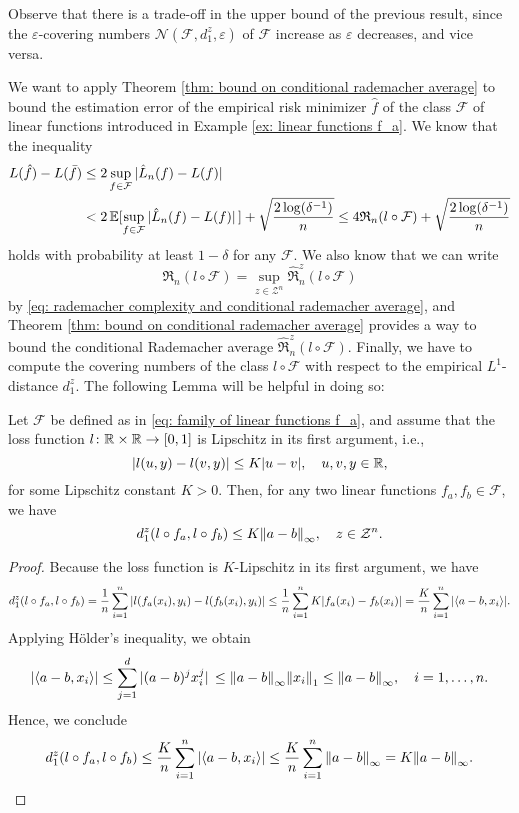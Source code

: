Observe that there is a trade-off in the upper bound of the previous result, since the $\varepsilon$-covering numbers $\mathcal{N}(\mathcal{F}, d_1^z, \varepsilon)$ of $\mathcal{F}$ increase as $\varepsilon$ decreases, and vice versa. 

We want to apply Theorem \ref{thm: bound on conditional rademacher average} to bound the estimation error of the empirical risk minimizer $\hat{f}$ of the class $\mathcal{F}$ of linear functions introduced in Example \ref{ex: linear functions f_a}. We know that the inequality
\begin{align*}
    L(\hat{f}) - L(\bar{f}) &\leq 2 \sup_{f \in \mathcal{F}} \abs*{\hat{L}_n(f) - L(f)} \\
    &< 2 \operatorname{\mathbb{E}}[\sup_{f \in \mathcal{F}} \abs*{\hat L_n(f) - L(f)}] + \sqrt{\frac{2 \log(\delta^{-1})}{n}} \leq 4 \mathfrak{R}_n(l \circ \mathcal{F}) + \sqrt{\frac{2 \log(\delta^{-1})}{n}}
\end{align*}
holds with probability at least $1 - \delta$ for any $\mathcal{F}$. We also know that we can write
\[
    \mathfrak{R}_n(l \circ \mathcal{F}) = \sup_{z \in \mathcal{Z}^n} \hat{\mathfrak{R}}_n^z(l \circ \mathcal{F})
\]
by \eqref{eq: rademacher complexity and conditional rademacher average}, and Theorem \ref{thm: bound on conditional rademacher average} provides a way to bound the conditional Rademacher average $\hat{\mathfrak{R}}_n^z(l \circ \mathcal{F})$. Finally, we have to compute the covering numbers of the class $l \circ \mathcal{F}$ with respect to the empirical $L^1$-distance $d_1^z$. The following Lemma will be helpful in doing so:

\begin{lemma}
\label{lem: distance between linear functions f_a}
Let $\mathcal{F}$ be defined as in \eqref{eq: family of linear functions f_a}, and assume that the loss function $l \colon \mathbb{R} \times \mathbb{R} \to [0, 1]$ is Lipschitz in its first argument, i.e.,
\[
    \abs{l(u, y) - l(v, y)} \leq K \abs{u - v}, \quad u, v, y \in \mathbb{R},
\]
for some Lipschitz constant $K > 0$. Then, for any two linear functions $f_a, f_b \in \mathcal{F}$, we have
\[
    d_1^z(l \circ f_a, l \circ f_b) \leq K \norm{a - b}_{\infty}, \quad z \in \mathcal{Z}^n.
\]
\end{lemma}

\begin{proof}
Because the loss function is $K$-Lipschitz in its first argument, we have
\[
    d_1^z(l \circ f_a, l \circ f_b) = \frac{1}{n} \sum_{i=1}^n \abs{l(f_a(x_i), y_i) - l(f_b(x_i), y_i)} \leq \frac{1}{n} \sum_{i=1}^n K \abs{f_a(x_i) - f_b(x_i)} = \frac{K}{n} \sum_{i=1}^n \abs{\langle a - b, x_i \rangle}.
\]
Applying H{\"o}lder's inequality, we obtain
\[
    \abs{\langle a - b, x_i \rangle} \leq \sum_{j=1}^d \abs*{(a - b)^j x_i^j} \leq \norm{a - b}_{\infty} \norm{x_i}_1 \leq \norm{a - b}_{\infty}, \quad i = 1, \dots, n.
\]
Hence, we conclude
\[
    d_1^z(l \circ f_a, l \circ f_b) \leq \frac{K}{n} \sum_{i=1}^n \abs{\langle a - b, x_i \rangle} \leq \frac{K}{n} \sum_{i=1}^n \norm{a - b}_{\infty} = K \norm{a - b}_{\infty}. \qedhere
\]
\end{proof}

